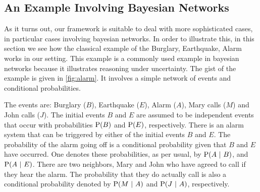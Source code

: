 \documentclass[adraft,copyright,creativecommons]{eptcs}
\newcommand{\at}[1]{\ensuremath{\!\del{#1}}}
\newcommand{\pr}[1]{\ensuremath{\mathrm{P}\at{#1}}}
\newcommand{\given}{\ensuremath{~\middle|~}}
\begin{document}
\subsection{An Example Involving Bayesian Networks}\label{subsec:example.bayesian.networks}
%
%
%
As it turns out, our framework is suitable to deal with more sophisticated cases, in particular cases involving bayesian networks. In order to illustrate this, in this section we see how the classical example of the Burglary, Earthquake, Alarm \cite{Judea88} works in our setting. This example is a commonly used example in bayesian networks because it illustrates reasoning under uncertainty.  The gist of the example is given in \cref{fig:alarm}. It involves a simple network of events and conditional probabilities.

The events are: Burglary ($B$), Earthquake ($E$), Alarm ($A$), Mary calls ($M$) and John calls ($J$). The initial events $B$ and $E$ are assumed to be independent events that occur with probabilities $\pr{B}$ and $\pr{E}$, respectively. There is an alarm system that can be triggered by either of the initial events $B$ and $E$. The probability of the alarm going off is a conditional probability given that $B$ and $E$ have occurred. One denotes these probabilities, as per usual,  by $\pr{A \given B}$, and $\pr{A \given E}$. There are two neighbors, Mary and John who have agreed to call if they hear the alarm. The probability that they do actually call is also a conditional probability denoted by $\pr{M \given A}$ and $\pr{J \given A}$, respectively.
\end{document}
